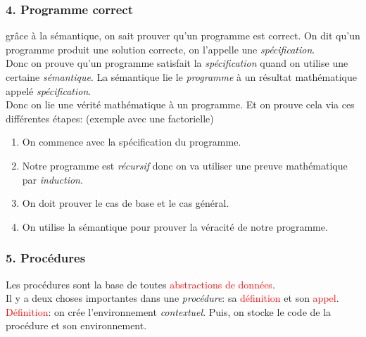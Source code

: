 \documentclass{report}
\begin{document}
\subsubsection{4. Programme correct}
grâce à la sémantique, on sait prouver qu'un programme est correct. On dit qu'un programme produit une solution correcte, on l'appelle une \textit{spécification}.\\
Donc on prouve qu'un programme satisfait la \textit{spécification} quand on utilise une certaine \textit{sémantique}. La sémantique lie le \textit{programme} à un résultat mathématique appelé \textit{spécification}.\\

Donc on lie une vérité mathématique à un programme. Et on prouve cela via ces différentes étapes: (exemple avec une factorielle)

\begin{enumerate}
\item On commence avec la spécification du programme.
\item Notre programme est \textit{récursif} donc on va utiliser une preuve mathématique par \textit{induction}.
\item On doit prouver le cas de base et le cas général.
\item On utilise la sémantique pour prouver la véracité de notre programme.
\end{enumerate}

\subsubsection{5. Procédures}
Les procédures sont la base de toutes \textcolor{red}{abstractions de données}.\\
Il y a deux choses importantes dans une \textit{procédure}: sa \textcolor{red}{définition} et son \textcolor{red}{appel}.\\

\textcolor{red}{Définition}: on crée l'environnement \textit{contextuel}. Puis, on stocke le code de la procédure et son environnement.\\
\end{document}
